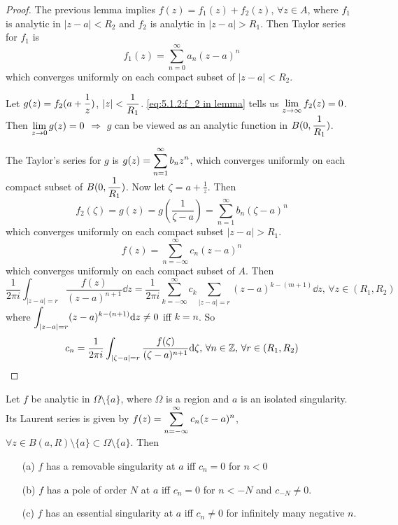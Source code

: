 \begin{proof}
    The previous lemma implies  $ f(z)=f_1(z)+f_2(z),\,\forall z\in A $, where  $ f_1  $ is analytic in  $ |z-a|<R_2 $ and  $ f_2  $ is analytic in  $ |z-a|>R_1 $. Then Taylor series for  $ f_1  $ is
    \begin{equation}
        f_1(z)=\sum_{n=0}^\infty a_n(z-a)^n
    \end{equation}
    which converges uniformly on each compact subset of  $ |z-a|<R_2 $.
    
    Let  $ g(z)=f_2(a+\displaystyle\frac{1}{z}) $,  $ |z|<\displaystyle\frac{1}{R_1} $. \eqref{eq:5.1.2:f_2 in lemma} tells us  $ \displaystyle\lim_{z\to\infty}f_2(z)=0 $. Then  $ \displaystyle\lim_{z\to 0}g(z)=0 $ $ \Rightarrow  $  $ g $ can be viewed as an analytic function in  $ B(0,\displaystyle\frac{1}{R_1}) $.

    The Taylor's series for  $ g  $ is  $ g(z)=\displaystyle\sum_{n=1}^\infty b_nz^n  $, which converges uniformly on each compact subset of  $ B(0,\displaystyle\frac{1}{R_1}) $. Now let  $ \zeta=a+\frac{1}{z} $. Then 
    \begin{equation}
        f_2(\zeta)=g(z)=g(\frac{1}{\zeta-a})=\sum_{n=1}^\infty b_n (\zeta-a)^n
    \end{equation} 
    which converges uniformly on each compact subset  $ |z-a|>R_1 $.  
    \begin{equation}
        f(z)=\sum_{n=-\infty}^\infty c_n(z-a)^n
    \end{equation}
    which converges uniformly on each compact subset of  $ A $. Then
    \begin{equation}
        \frac{1}{2\pi i}\int_{|z-a|=r}\frac{f(z)}{(z-a)^{n+1}}\dd z =\frac{1}{2\pi i}\sum_{k=-\infty}^\infty c_k\sum_{|z-a|=r}(z-a)^{k-(m+1)}\dd z,\,\forall z\in (R_1,R_2)
    \end{equation}
    where  $ \displaystyle\int_{|z-a|=r}(z-a)^{k-(n+1)}\mathrm{d} z\neq 0 $ iff  $ k=n $.  So 
    \begin{equation}
        c_n=\frac{1 }{2\pi i}\int_{|\zeta-a|=r}\frac{f(\zeta)}{(\zeta-a)^{n+1}}\mathrm{d}\zeta,\,\forall n\in \mathbb Z,\,\forall r\in (R_1,R_2)
    \end{equation}
\end{proof}
\begin{theorem}
    Let  $ f  $ be analytic in  $ \Omega\setminus\{a\} $, where  $ \Omega  $ is a region and  $ a  $ is an isolated singularity. Its Laurent series is given by  $ f(z)=\displaystyle\sum_{n=-\infty}^\infty c_n(z-a)^n $, $ \forall z\in B(a,R)\setminus\{a\}\subset \Omega\setminus\{a\} $. Then 
    \begin{enumerate}
        \item [(a)]  $ f  $ has a removable singularity at  $ a  $ iff  $ c_n =0 $ for  $ n<0 $   
        \item [(b)]  $ f  $ has a pole of order  $ N $ at  $ a $ iff  $ c_n=0 $ for  $ n<-N $ and  $ c_{-N}\neq 0 $.
        \item [(c)]  $ f  $ has an essential singularity at  $ a $ iff   $ c_n\neq 0 $ for infinitely many negative  $ n $.
    \end{enumerate}  
\end{theorem}
